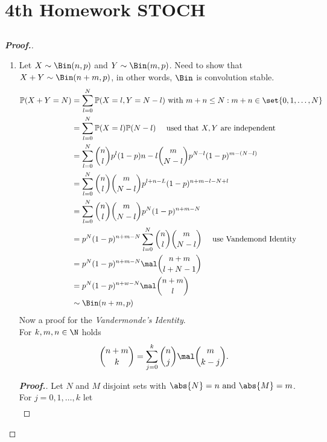 
\section{4th Homework STOCH}
\subsection{}
\begin{proof}[\textbf{Proof.}]\
	\begin{enumerate}
		\item Let $X \sim \Bin(n,p)$ and $Y\sim \Bin(m,p)$. Need to show that $X+Y \sim \Bin(n+m, p)$, in other words, $\Bin$ is convolution stable.
		\begin{align*}
			\meas(X + Y = N) &= \sum_{l=0}^N \meas(X=l, Y = N-l) \with m+n \le N: m+n \in \set{0,1,\dots, N}\\
			&= \sum_{l=0}^N \meas(X=l)\meas(N-l) \quad \text{ used that } X,Y \text{ are independent}\\
			&= \sum_{l=0}^N \binom{n}{l}p^l (1-p){n-l}\binom{m}{N-l}p^{N-l}(1-p)^{m - (N-l)}\\
			&= \sum_{l=0}^N \binom{n}{l}\binom{m}{N-l} p^{l+n-L}(1-p)^{n+m-l-N+l}\\
			&= \sum_{l=0}^N\binom{n}{l}\binom{m}{N-l}p^N (1-p)^{n+m - N}\\
			&= p^N (1-p)^{n+m-N}\sum_{l=0}^N \binom{n}{l}\binom{m}{N-l} \quad \text{ use Vandemond Identity}\\
			&= p^N (1-p)^{n+m-N}\mal \binom{n+m}{l+N-1}\\
			&= p^N (1-p)^{n+w-N}\mal \binom{n+m}{l}\\
			& \sim \Bin(n+m,p)
		\end{align*}
		Now a proof for the \emph{Vandermonde's Identity}.\\
		For $k,m,n \in \N$ holds
		\begin{align*}
			\binom{n+m}{k} = \sum_{j=0}^k \binom{n}{j}\mal \binom{m}{k-j}.
		\end{align*}
		\begin{proof}[\textbf{Proof.}]
			Let $N$ and $M$ disjoint sets with $\abs{N} = n \and \abs{M} = m$. For $j = 0,1,\dots,k$ let
			\begin{align*}

\end{align*}
\end{proof}
\end{enumerate}
\end{proof}
